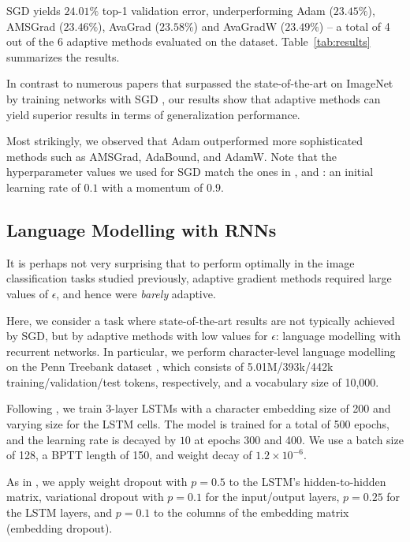 \documentclass{article}
\begin{document}
SGD yields
$24.01\%$ top-1 validation error, underperforming
    Adam ($23.45\%$),
 AMSGrad ($23.46\%$),
 AvaGrad ($23.58\%$) and
AvaGradW ($23.49\%$) -- a total of 4 out of the 6 adaptive methods evaluated on the dataset. Table~\ref{tab:results} summarizes the results.

In contrast to numerous papers that surpassed the state-of-the-art on ImageNet by training networks with SGD \citep{vgg, googlenet, resnet1, resnet2, wide, resnext}, our results show that adaptive methods can yield superior results in terms of generalization performance.

Most strikingly, we observed that Adam outperformed more sophisticated methods such as AMSGrad, AdaBound, and AdamW.  Note that the hyperparameter values we used for SGD match the ones in
\citet{resnet1}, \citet{resnet2} and \citet{gross}: an initial learning rate of
$0.1$ with a momentum of $0.9$. 


\subsection{Language Modelling with RNNs}

It is perhaps not very surprising that to perform optimally in the image
classification tasks studied previously, adaptive gradient methods required
large values of $\epsilon$, and hence were \emph{barely} adaptive.

Here, we
consider a task where state-of-the-art results are not typically achieved by SGD, but by
adaptive methods with low values for $\epsilon$: language modelling with
recurrent networks. In particular, we perform character-level language
modelling on the Penn Treebank dataset \citep{ptb,ptbc}, which consists of 5.01M/393k/442k training/validation/test tokens, respectively, and a vocabulary size of 10,000.

Following \citet{awd}, we train 3-layer LSTMs \citep{lstm} with a character embedding size of 200 and varying size for the LSTM cells. The model is trained for a total of 500 epochs,
and the learning rate is decayed by $10$ at epochs 300 and 400.  We use a batch size
of 128, a BPTT length of 150, and weight decay of $1.2 \times 10^{-6}$.

As in \citet{awd}, we apply weight dropout with $p=0.5$ to the LSTM's hidden-to-hidden matrix, variational dropout \citep{variationaldropout} with $p=0.1$ for the input/output layers, $p=0.25$ for the LSTM layers, and $p=0.1$ to the columns of the embedding matrix (embedding dropout).
\end{document}
